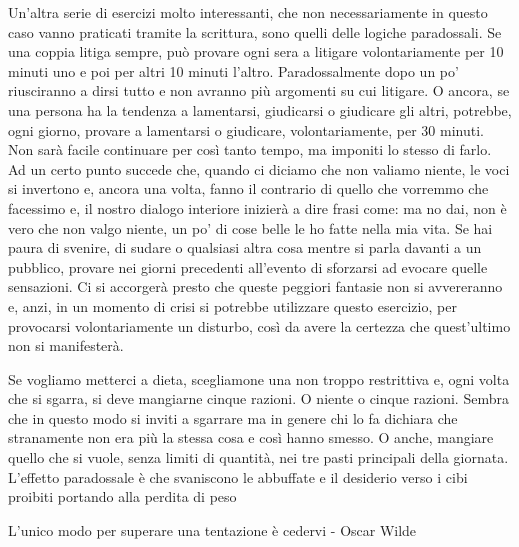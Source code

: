 \documentclass[12pt]{book} %
\begin{document}
\begin{mdframed}[linewidth=1pt]
Un'altra serie di esercizi molto interessanti, che non necessariamente in questo caso vanno
praticati tramite la scrittura, sono quelli delle logiche paradossali. Se una coppia litiga sempre, può provare ogni
sera a litigare volontariamente per 10 minuti uno e poi per altri 10 minuti l'altro.
Paradossalmente dopo un po' riusciranno a dirsi tutto e non avranno più argomenti su cui litigare. O ancora, se una
persona ha la tendenza a lamentarsi, giudicarsi o giudicare gli altri, potrebbe, ogni giorno, provare a lamentarsi o
giudicare, volontariamente, per 30 minuti. Non sarà facile continuare per così tanto tempo, ma imponiti lo stesso di
farlo. Ad un certo punto succede che, quando ci diciamo che non valiamo niente, le voci si invertono e, ancora una
volta, fanno il contrario di quello che vorremmo che facessimo e, il nostro dialogo interiore inizierà a dire frasi
come: ma no dai, non è vero che non valgo niente, un po' di cose belle le ho fatte nella mia vita. 
Se hai paura di svenire, di sudare o qualsiasi altra cosa mentre si parla davanti a un pubblico, provare nei giorni
precedenti all'evento di sforzarsi ad evocare quelle sensazioni. Ci si accorgerà presto che queste
peggiori fantasie non si avvereranno e, anzi, in un momento di crisi si potrebbe utilizzare questo esercizio, per
provocarsi volontariamente un disturbo, così da avere la certezza che quest'ultimo non si manifesterà.

Se vogliamo metterci a dieta, scegliamone una non troppo restrittiva e, ogni volta che si sgarra, si deve mangiarne
cinque razioni. O niente o cinque razioni. Sembra che in questo modo si inviti a sgarrare ma in genere chi lo fa
dichiara che stranamente non era più la stessa cosa e così hanno smesso. O anche, mangiare quello che si vuole, senza
limiti di quantità, nei tre pasti principali della giornata. L'effetto paradossale è che
svaniscono le abbuffate e il desiderio verso i cibi proibiti portando alla perdita di peso

L'unico modo per superare una tentazione è cedervi - Oscar Wilde


\end{mdframed}
\end{document}
